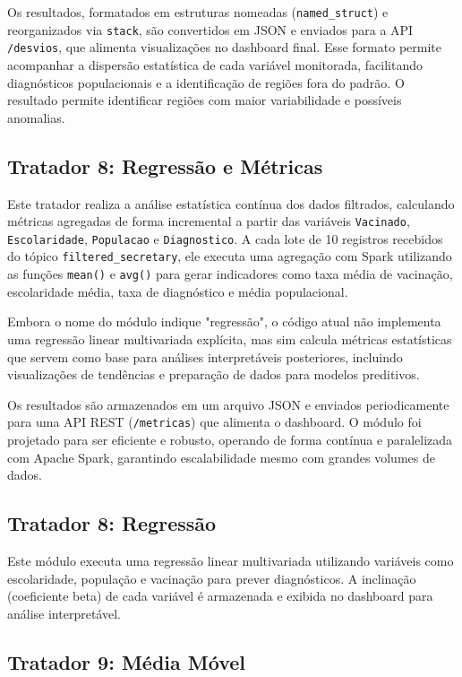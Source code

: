 \documentclass[a4paper,12pt]{article}
\begin{document}
Os resultados, formatados em estruturas nomeadas (\texttt{named\_struct}) e reorganizados via \texttt{stack}, são convertidos em JSON e enviados para a API \texttt{/desvios}, que alimenta visualizações no dashboard final. Esse formato permite acompanhar a dispersão estatística de cada variável monitorada, facilitando diagnósticos populacionais e a identificação de regiões fora do padrão. O resultado permite identificar regiões com maior variabilidade e possíveis anomalias.

\subsection{Tratador 8: Regressão e Métricas}

Este tratador realiza a análise estatística contínua dos dados filtrados, calculando métricas agregadas de forma incremental a partir das variáveis \texttt{Vacinado}, \texttt{Escolaridade}, \texttt{Populacao} e \texttt{Diagnostico}. A cada lote de 10 registros recebidos do tópico \texttt{filtered\_secretary}, ele executa uma agregação com Spark utilizando as funções \texttt{mean()} e \texttt{avg()} para gerar indicadores como taxa média de vacinação, escolaridade média, taxa de diagnóstico e média populacional.

Embora o nome do módulo indique "regressão", o código atual não implementa uma regressão linear multivariada explícita, mas sim calcula métricas estatísticas que servem como base para análises interpretáveis posteriores, incluindo visualizações de tendências e preparação de dados para modelos preditivos.

Os resultados são armazenados em um arquivo JSON e enviados periodicamente para uma API REST (\texttt{/metricas}) que alimenta o dashboard. O módulo foi projetado para ser eficiente e robusto, operando de forma contínua e paralelizada com Apache Spark, garantindo escalabilidade mesmo com grandes volumes de dados.


\subsection{Tratador 8: Regressão}

Este módulo executa uma regressão linear multivariada utilizando variáveis como escolaridade, população e vacinação para prever diagnósticos. A inclinação (coeficiente beta) de cada variável é armazenada e exibida no dashboard para análise interpretável.

\subsection{Tratador 9: Média Móvel}
\end{document}
